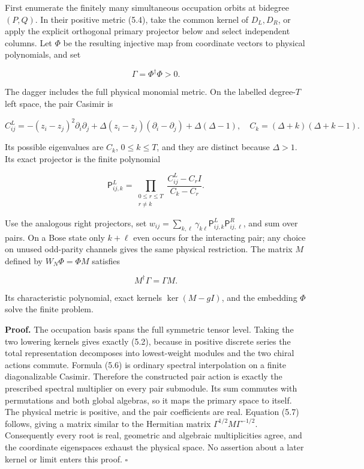 First enumerate the finitely many simultaneous occupation orbits at bidegree \((P,Q)\). In their positive metric (5.4), take the common kernel of \(D_L,D_R\), or apply the explicit orthogonal primary projector below and select independent columns. Let \(\Phi\) be the resulting injective map from coordinate vectors to physical polynomials, and set

\[
\Gamma=\Phi^\dagger\Phi>0.
\]

The dagger includes the full physical monomial metric. On the labelled degree-\(T\) left space, the pair Casimir is

\[
C_{ij}^L=-(z_i-z_j)^2\partial_i\partial_j
+\Delta(z_i-z_j)(\partial_i-\partial_j)+\Delta(\Delta-1),
\quad C_k=(\Delta+k)(\Delta+k-1).
\tag{5.5}
\]

Its possible eigenvalues are \(C_k\), \(0\le k\le T\), and they are distinct because \(\Delta>1\). Its exact projector is the finite polynomial

\[
\mathsf P_{ij,k}^L
=\prod_{\substack{0\le r\le T\\r\ne k}}
\frac{C_{ij}^L-C_rI}{C_k-C_r}.
\tag{5.6}
\]

Use the analogous right projectors, set \(w_{ij}=\sum_{k,\ell}\gamma_{k\ell}\mathsf P^L_{ij,k}\mathsf P^R_{ij,\ell}\), and sum over pairs. On a Bose state only \(k+\ell\) even occurs for the interacting pair; any choice on unused odd-parity channels gives the same physical restriction. The matrix \(M\) defined by \(W_N\Phi=\Phi M\) satisfies

\[
M^\dagger\Gamma=\Gamma M.
\tag{5.7}
\]

Its characteristic polynomial, exact kernels \(\ker(M-gI)\), and the embedding \(\Phi\) solve the finite problem.

\textbf{Proof.} The occupation basis spans the full symmetric tensor level. Taking the two lowering kernels gives exactly (5.2), because in positive discrete series the total representation decomposes into lowest-weight modules and the two chiral actions commute. Formula (5.6) is ordinary spectral interpolation on a finite diagonalizable Casimir. Therefore the constructed pair action is exactly the prescribed spectral multiplier on every pair submodule. Its sum commutes with permutations and both global algebras, so it maps the primary space to itself. The physical metric is positive, and the pair coefficients are real. Equation (5.7) follows, giving a matrix similar to the Hermitian matrix \(\Gamma^{1/2}M\Gamma^{-1/2}\). Consequently every root is real, geometric and algebraic multiplicities agree, and the coordinate eigenspaces exhaust the physical space. No assertion about a later kernel or limit enters this proof. \(\square\)

